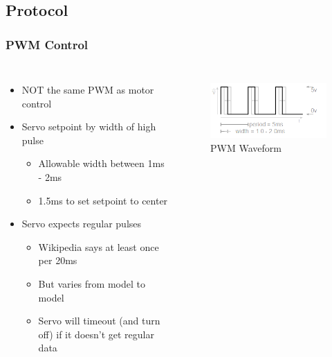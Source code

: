 \documentclass{beamer}
\begin{document}
\subsection{Protocol}

\begin{frame}
\frametitle{PWM Control}
\begin{columns}[t]
\begin{itemize}
  \item NOT the same PWM as motor control
  \item Servo setpoint by width of high pulse
  \begin{itemize}
    \item Allowable width between 1ms - 2ms
    \item 1.5ms to set setpoint to center
  \end{itemize}
  \item Servo expects regular pulses
  \begin{itemize}
    \item Wikipedia says at least once per 20ms
    \item But varies from model to model
    \item Servo will timeout (and turn off) if it doesn't get regular data
  \end{itemize}
\end{itemize}

\begin{figure}
  \centering
  \includegraphics[width=1.0\columnwidth]{images-dis3/pwmwave-multi} \\
  PWM Waveform
\end{figure}
\end{columns}
\end{frame}
\end{document}
